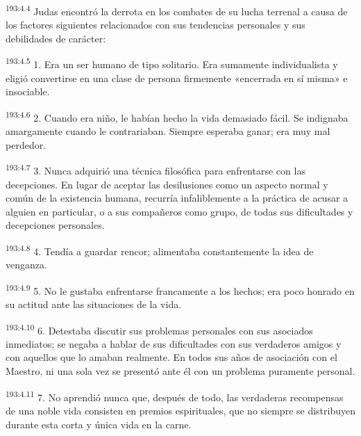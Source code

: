 \par 
\textsuperscript{193:4.4} Judas encontró la derrota en los combates de su lucha terrenal a causa de los factores siguientes relacionados con sus tendencias personales y sus debilidades de carácter:

\par 
\textsuperscript{193:4.5} 1. Era un ser humano de tipo solitario. Era sumamente individualista y eligió convertirse en una clase de persona firmemente «encerrada en sí misma» e insociable.

\par 
\textsuperscript{193:4.6} 2. Cuando era niño, le habían hecho la vida demasiado fácil. Se indignaba amargamente cuando le contrariaban. Siempre esperaba ganar; era muy mal perdedor.

\par 
\textsuperscript{193:4.7} 3. Nunca adquirió una técnica filosófica para enfrentarse con las decepciones. En lugar de aceptar las desilusiones como un aspecto normal y común de la existencia humana, recurría infaliblemente a la práctica de acusar a alguien en particular, o a sus compañeros como grupo, de todas sus dificultades y decepciones personales.

\par 
\textsuperscript{193:4.8} 4. Tendía a guardar rencor; alimentaba constantemente la idea de venganza.

\par 
\textsuperscript{193:4.9} 5. No le gustaba enfrentarse francamente a los hechos; era poco honrado en su actitud ante las situaciones de la vida.

\par 
\textsuperscript{193:4.10} 6. Detestaba discutir sus problemas personales con sus asociados inmediatos; se negaba a hablar de sus dificultades con sus verdaderos amigos y con aquellos que lo amaban realmente. En todos sus años de asociación con el Maestro, ni una sola vez se presentó ante él con un problema puramente personal.

\par 
\textsuperscript{193:4.11} 7. No aprendió nunca que, después de todo, las verdaderas recompensas de una noble vida consisten en premios espirituales, que no siempre se distribuyen durante esta corta y única vida en la carne.

